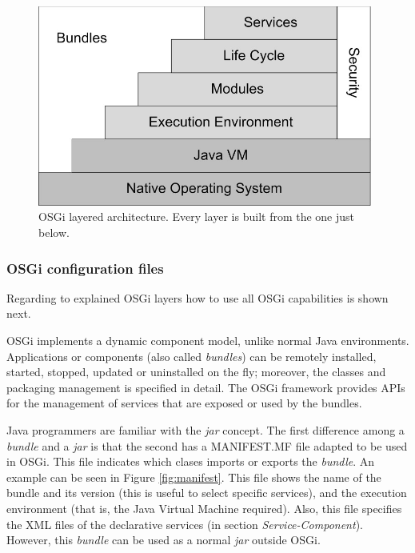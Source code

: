 \begin{figure}
\centering
\includegraphics[width=26pc]{gfx/soa/osgi-oficial.jpg}
\caption{OSGi layered architecture. Every layer is built from the one just below.}
\label{fig:osgi-original}
\end{figure}






\subsubsection{OSGi configuration files}
Regarding to explained OSGi layers how to use all OSGi capabilities is shown next. 

OSGi implements a dynamic component model, unlike normal Java
environments. Applications or components (also called
\emph{bundles}) can be remotely installed, started, stopped, updated
or uninstalled on the fly; moreover, the classes and
packaging management is specified in detail. The OSGi framework provides
APIs for the management of services that are exposed or used by the
bundles.

Java programmers are familiar with the {\em jar} concept. The first difference among a {\em bundle} and a {\em jar} is that the second has a MANIFEST.MF file adapted to be used in OSGi. This file indicates which clases imports or exports the {\em bundle}. An example can be seen in Figure \ref{fig:manifest}. This file shows the name of the bundle and its version (this is useful to select specific services), and the execution environment (that is, the Java Virtual Machine required). Also, this file specifies the XML files of the declarative services (in section {\em Service-Component}). However, this {\em bundle} can be used as a normal {\em jar} outside OSGi.

